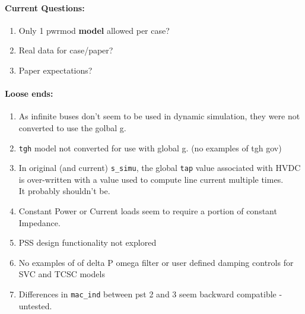 \documentclass[12pt]{article}
\begin{document}
\begin{multicols}{2}
	

\vfill\null
\columnbreak




\paragraph{Current Questions:}
	\begin{enumerate}
	\itemsep0em 
	
	\item Only 1 pwrmod \textbf{model} allowed per case?
	\item Real data for case/paper?
	\item Paper expectations?
	
	\end{enumerate}	

\paragraph{Loose ends:} %
	\begin{enumerate}
	\item As infinite buses don't seem to be used in dynamic simulation, they were not converted to use the golbal g.
		\item \verb|tgh| model not converted for use with global g. (no examples of tgh gov)
		\item In original (and current) \verb|s_simu|, the global \verb|tap| value associated with HVDC is over-written with  a value used to compute line current multiple times. \\It probably shouldn't be.
		\item Constant Power or Current loads seem to require a portion of constant Impedance.
		\item PSS design functionality not explored
		\item No examples of of delta P omega filter or user defined damping controls for SVC and TCSC models
		\item Differences in \verb|mac_ind| between pst 2 and 3 seem backward compatible - untested.
	\end{enumerate}
	

\end{multicols}
\end{document}
